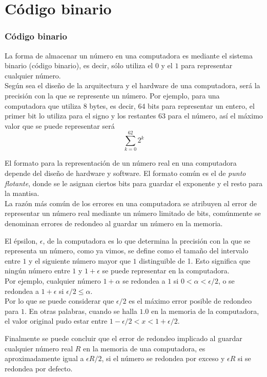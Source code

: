 \section{Código binario}
\begin{frame}
\frametitle{Código binario}
La forma de almacenar un número en una computadora es mediante el sistema binario (código binario), es decir, sólo utiliza el $0$ y el $1$ para representar cualquier número.
\\
\medskip
Según sea el diseño de la arquitectura y el hardware de una computadora, será la precisión con la que se represente un número. Por ejemplo, para una computadora que utiliza 8 bytes, es decir, 64 bits para representar un entero, el primer bit lo utiliza para el signo y los restantes 63 para el número, así el máximo valor que se puede representar será
\[ \sum_{k=0}^{62} 2^{k} \]
\end{frame}
\begin{frame}
El formato para la representación de un número real en una computadora depende del diseño de
hardware y software. El formato común es el de \emph{punto flotante}, donde se le asignan ciertos bits para guardar el exponente y el resto para la mantisa.
\\
\medskip
La razón más común de los errores en una computadora se atribuyen al error de representar un número real mediante un número limitado de bits, comúnmente se denominan errores de redondeo al guardar un número en la memoria.
\end{frame}
\begin{frame}
El épsilon, $\epsilon$, de la computadora es lo que determina la precisión con la que se representa un número, como ya vimos, se define como el tamaño del intervalo entre $1$ y el siguiente número mayor que $1$ distinguible de 1. Esto significa que ningún número entre $1$ y  $1 + \epsilon$ se puede representar en la computadora.
\\
\medskip
Por ejemplo, cualquier número $1 + \alpha$ se redondea a $1$ si $0 <\alpha <\epsilon/2$, o se redondea a $1 + \epsilon$ si $\epsilon/2 \leq \alpha$.
\\
\medskip
Por lo que se puede considerar que $\epsilon/2$ es el máximo error posible de redondeo para $1$. En otras palabras, cuando se halla $1.0$ en la memoria de la computadora, el valor original pudo estar entre $1-\epsilon/2 < x < 1 + \epsilon/2$.
\end{frame}
\begin{frame}
Finalmente se puede concluir que el error de redondeo implicado al guardar cualquier número real
$R$ en la memoria de una computadora, es aproximadamente igual a $\epsilon R / 2$, si el número se redondea por exceso y $\epsilon R$ si se redondea por defecto.
\end{frame}
